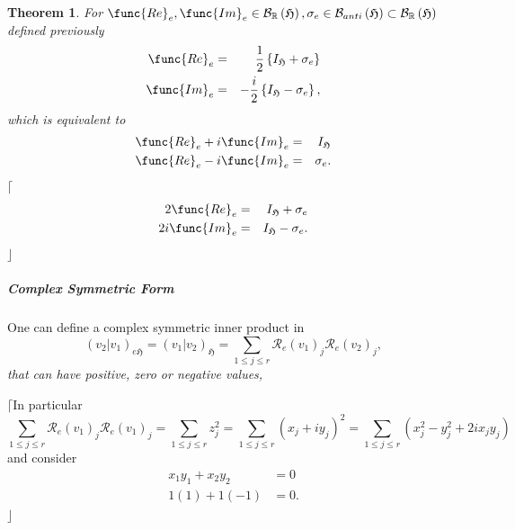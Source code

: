 \documentclass[aps,preprint]{revtex4}
\newtheorem{theorem}{Theorem}
\begin{document}
\begin{theorem}
For $\func{Re}_{e},\func{Im}_{e}\in \mathcal{B}_{\mathbb{R}}\left( \mathfrak{%
H}\right) ,\sigma _{e}\in \mathcal{B}_{anti}\left( \mathfrak{H}\right)
\subset \mathcal{B}_{\mathbb{R}}\left( \mathfrak{H}\right) $ defined
previously 
\begin{eqnarray}
\func{Re}_{e} &=&\frac{1}{2}\left\{ I_{\mathfrak{H}}+\sigma _{e}\right\} \\
\func{Im}_{e} &=&-\frac{i}{2}\left\{ I_{\mathfrak{H}}-\sigma _{e}\right\} ,
\end{eqnarray}%
which is equivalent to 
\begin{eqnarray}
\func{Re}_{e}+i\func{Im}_{e} &=&I_{\mathfrak{H}} \\
\func{Re}_{e}-i\func{Im}_{e} &=&\sigma _{e}.
\end{eqnarray}%
$\lceil $%
\begin{eqnarray}
2\func{Re}_{e} &=&I_{\mathfrak{H}}+\sigma _{e} \\
2i\func{Im}_{e} &=&I_{\mathfrak{H}}-\sigma _{e}.
\end{eqnarray}%
$\rfloor $
\end{theorem}

\subparagraph{Complex Symmetric Form}

One can define a complex symmetric inner product in 
\begin{equation}
\left( \left. v_{2}\right\vert v_{1}\right) _{e\mathfrak{H}}=\left( \left.
v_{1}\right\vert v_{2}\right) _{\mathfrak{H}}=\sum_{1\leq j\leq r}\mathcal{R}%
_{e}\left( v_{1}\right) _{j}\mathcal{R}_{e}\left( v_{2}\right) _{j},
\end{equation}%
\emph{that can have positive, zero or negative values, }

$\lceil $In particular \emph{\ } 
\begin{equation}
\sum_{1\leq j\leq r}\mathcal{R}_{e}\left( v_{1}\right) _{j}\mathcal{R}%
_{e}\left( v_{1}\right) _{j}=\sum_{1\leq j\leq r}z_{j}^{2}=\sum_{1\leq j\leq
r}\left( x_{j}+iy_{j}\right) ^{2}=\sum_{1\leq j\leq r}\left(
x_{j}^{2}-y_{j}^{2}+2ix_{j}y_{j}\right)
\end{equation}%
and consider 
\begin{align}
x_{1}y_{1}+x_{2}y_{2}& =0 \\
1\left( 1\right) +1\left( -1\right) & =0.
\end{align}%
$\rfloor $
\end{document}

